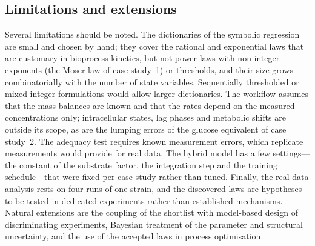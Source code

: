 

\subsection{Limitations and extensions}
Several limitations should be noted. The dictionaries of the symbolic regression are small and chosen by hand; they cover the rational and exponential laws that are customary in bioprocess kinetics, but not power laws with non-integer exponents (the Moser law of case study~1) or thresholds, and their size grows combinatorially with the number of state variables. Sequentially thresholded or mixed-integer formulations \citep{Brunton2016} would allow larger dictionaries. The workflow assumes that the mass balances are known and that the rates depend on the measured concentrations only; intracellular states, lag phases and metabolic shifts are outside its scope, as are the lumping errors of the glucose equivalent of case study~2. The adequacy test requires known measurement errors, which replicate measurements would provide for real data. The hybrid model has a few settings---the constant of the substrate factor, the integration step and the training schedule---that were fixed per case study rather than tuned. Finally, the real-data analysis rests on four runs of one strain, and the discovered laws are hypotheses to be tested in dedicated experiments rather than established mechanisms. Natural extensions are the coupling of the shortlist with model-based design of discriminating experiments, Bayesian treatment of the parameter and structural uncertainty, and the use of the accepted laws in process optimisation.
